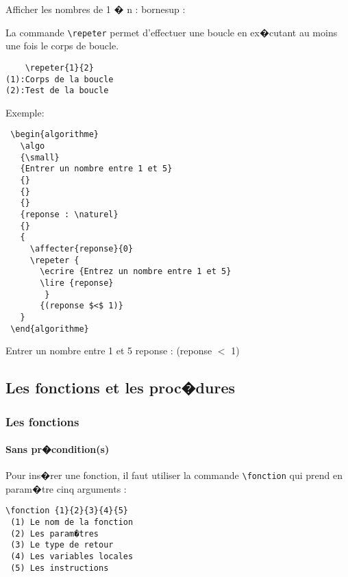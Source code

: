 \documentclass[a4paper,12pt]{report}
\begin{document}
  \begin{algorithme}
    \algo
    {\small}
    {Afficher les nombres de 1 � }
    {}
    {n : \naturel}
    {bornesup : \naturel}
    {}
    {}
    {
         {
         }
    }
  \end{algorithme}



La commande \texttt{\textbackslash repeter} permet d'effectuer une boucle en ex�cutant au moins une fois le corps de boucle.

  \begin{lstlisting}
    \repeter{1}{2}
(1):Corps de la boucle
(2):Test de la boucle
  \end{lstlisting}
Exemple:
  \begin{lstlisting}
 \begin{algorithme}
   \algo 
   {\small}
   {Entrer un nombre entre 1 et 5}
   {}
   {}
   {}
   {reponse : \naturel}
   {}
   {
     \affecter{reponse}{0}
     \repeter {
       \ecrire {Entrez un nombre entre 1 et 5}
       \lire {reponse}
        }
       {(reponse $<$ 1)}
   }
 \end{algorithme}
\end{lstlisting}

 \begin{algorithme}
   \algo 
   {\small}
   {Entrer un nombre entre 1 et 5}
   {}
   {}
   {}
   {reponse : \naturel}
   {}
   { 
       {(reponse $<$ 1)}
   }
 \end{algorithme}

\subsection{Les fonctions et les proc�dures}

\subsubsection{Les fonctions}
\paragraph{Sans pr�condition(s)}
Pour ins�rer une fonction, il faut utiliser la commande \texttt{\textbackslash fonction}  qui prend en param�tre cinq arguments :
\begin{lstlisting}
\fonction {1}{2}{3}{4}{5}
 (1) Le nom de la fonction 
 (2) Les param�tres 
 (3) Le type de retour
 (4) Les variables locales
 (5) Les instructions
\end{lstlisting}
\end{document}
